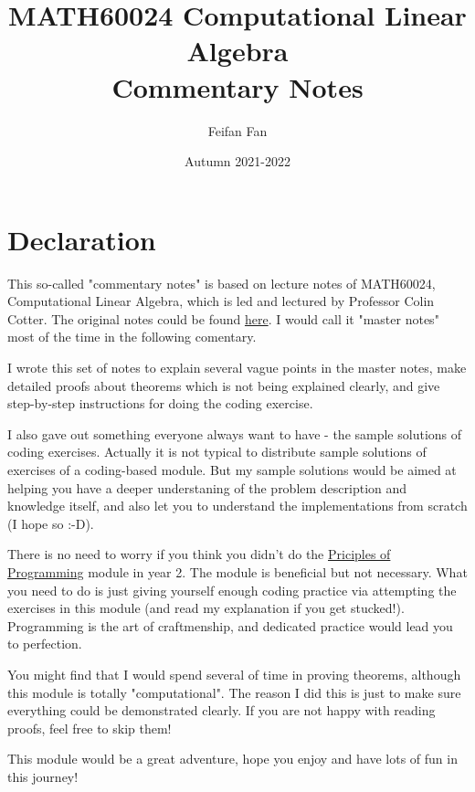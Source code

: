 \documentclass[a4paper,12pt,twoside]{report}
\begin{document}
\title{MATH60024 Computational Linear Algebra \\
Commentary Notes}
\date{Autumn 2021-2022}
\author{Feifan Fan}




\maketitle
\chapter*{Declaration}
This so-called "commentary notes" is based on lecture notes of MATH60024, Computational Linear Algebra, which is led and lectured by Professor Colin Cotter. 
The original notes could be found \href{https://comp-lin-alg.github.io}{here}. I would call it "master notes" most of the time in the following comentary.

I wrote this set of notes to explain several vague points in the master notes, make detailed proofs about theorems which is not being explained clearly, and give step-by-step instructions for doing the coding exercise.

I also gave out something everyone always want to have - the sample solutions of coding exercises. Actually it is not typical to distribute sample solutions of exercises of a coding-based module. But my sample solutions would be aimed at helping you have a deeper understaning of the problem description and knowledge itself, and also let you to understand the implementations from scratch (I hope so :-D).

There is no need to worry if you think you didn't do the \href{https://object-oriented-python.github.io}{Priciples of Programming} module in year 2. The module is beneficial but not necessary. What you need to do is just giving yourself enough coding practice via attempting the exercises in this module (and read my explanation if you get stucked!). Programming is the art of craftmenship, and dedicated practice would lead you to perfection.


You might find that I would spend several of time in proving theorems, although this module is totally "computational". The reason I did this is just to make sure everything could be demonstrated clearly. If you are not happy with reading proofs, feel free to skip them!

This module would be a great adventure, hope you enjoy and have lots of fun in this journey!
\end{document}
